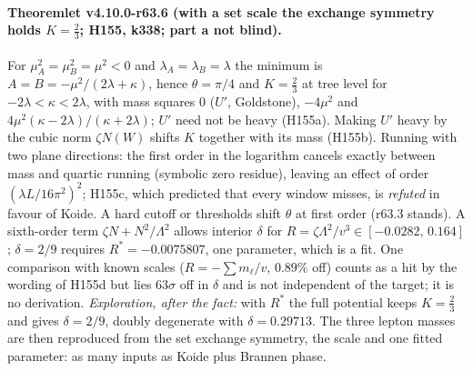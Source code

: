 \paragraph{Theoremlet v4.10.0-r63.6 (with a set scale the exchange symmetry holds \(K=\tfrac23\); H155, k338; part a not blind).}
For \(\mu_A^2=\mu_B^2=\mu^2<0\) and \(\lambda_A=\lambda_B=\lambda\) the minimum is \(A=B=-\mu^2/(2\lambda+\kappa)\), hence \(\theta=\pi/4\) and
\(K=\tfrac23\) at tree level for \(-2\lambda<\kappa<2\lambda\), with mass squares \(0\) (\(U'\), Goldstone), \(-4\mu^2\) and
\(4\mu^2(\kappa-2\lambda)/(\kappa+2\lambda)\); \(U'\) need not be heavy (H155a).  Making \(U'\) heavy by the cubic norm \(\zeta N(W)\) shifts \(K\)
together with its mass (H155b).  Running with two plane directions: the first order in the logarithm cancels exactly between mass and quartic
running (symbolic zero residue), leaving an effect of order \((\lambda L/16\pi^2)^2\); H155c, which predicted that every window misses, is
\emph{refuted} in favour of Koide.  A hard cutoff or thresholds shift \(\theta\) at first order (r63.3 stands).  A sixth-order term
\(\zeta N+N^2/\Lambda^2\) allows interior \(\delta\) for \(R=\zeta\Lambda^2/v^3\in[-0.0282,\,0.164]\); \(\delta=2/9\) requires
\(R^*=-0.0075807\), one parameter, which is a fit.  One comparison with known scales (\(R=-\sum m_\ell/v\), \(0.89\%\) off) counts as a hit by the
wording of H155d but lies \(63\sigma\) off in \(\delta\) and is not independent of the target; it is no derivation.  \emph{Exploration, after the
fact:} with \(R^*\) the full potential keeps \(K=\tfrac23\) and gives \(\delta=2/9\), doubly degenerate with \(\delta=0.29713\).  The three lepton
masses are then reproduced from the set exchange symmetry, the scale and one fitted parameter: as many inputs as Koide plus Brannen phase.

